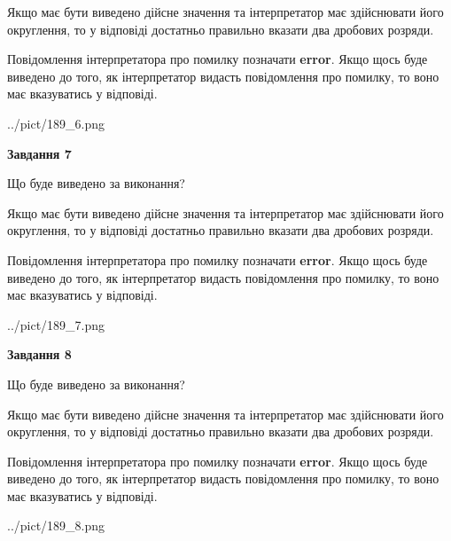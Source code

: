 \documentclass[12pt, ukrainian]{article}
\begin{document}
{\begin {Large}
Якщо має бути виведено дійсне значення та інтерпретатор має здійснювати його округлення, 
то у відповіді достатньо правильно вказати два дробових розряди.

Повідомлення інтерпретатора про помилку позначати \textbf{error}.
Якщо щось буде виведено до того, як інтерпретатор видасть повідомлення про помилку, 
то воно має вказуватись у відповіді. \par

\begin{center}
	{../pict/189_6.png}
\end{center}
\newpage

{\begin {center}\textbf{Завдання 7}\end {center}}\par
Що буде виведено за виконання? \par

Якщо має бути виведено дійсне значення та інтерпретатор має здійснювати його округлення, 
то у відповіді достатньо правильно вказати два дробових розряди.

Повідомлення інтерпретатора про помилку позначати \textbf{error}.
Якщо щось буде виведено до того, як інтерпретатор видасть повідомлення про помилку, 
то воно має вказуватись у відповіді. \par

\begin{center}
	{../pict/189_7.png}
\end{center}
\newpage

{\begin {center}\textbf{Завдання 8}\end {center}}\par
Що буде виведено за виконання? \par

Якщо має бути виведено дійсне значення та інтерпретатор має здійснювати його округлення, 
то у відповіді достатньо правильно вказати два дробових розряди.

Повідомлення інтерпретатора про помилку позначати \textbf{error}.
Якщо щось буде виведено до того, як інтерпретатор видасть повідомлення про помилку, 
то воно має вказуватись у відповіді. \par

\begin{center}
	{../pict/189_8.png}
\end{center}
\newpage


\end{Large}}
\end{document}
